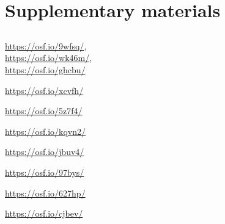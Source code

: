 
\chapter{Supplementary materials}

\label{app:AppendixA0} %

\section*{}
\begin{multicols}{2}\raggedcolumns
\begin{description}[font=\normalfont]
\item[Example \ref{ex:markedexamplesDECL}:] \url{https://osf.io/9wfsq/}, \\\url{https://osf.io/wk46m/}, \\\url{https://osf.io/ghcbu/} 
\item[Example \ref{ex:markedexamplesEXCL}:]        \url{https://osf.io/xcvfh/}
\item[Example \ref{ex:markedexamplesPARTclaro}:]   \url{https://osf.io/5z7f4/}
\item[Example \ref{ex:markedexamplesPARTanda}:]    \url{https://osf.io/kqvn2/}
\item[Example \ref{ex:unmarkedexamplesDECL}:]      \url{https://osf.io/jbuv4/} 
\item[Example \ref{ex:unmarkedexamplesEXCL}:]      \url{https://osf.io/97bys/} 
\item[Example \ref{ex:unmarkedexamplesPARTclaro}:] \url{https://osf.io/627hp/}
\item[Example \ref{ex:unmarkedexamplesPARTanda}:]  \url{https://osf.io/cjbev/}
\end{description}
\end{multicols}



